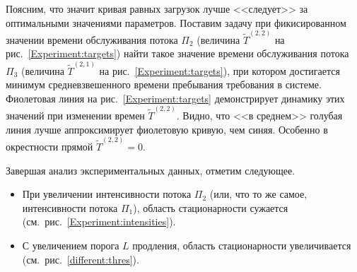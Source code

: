 Поясним, что значит кривая равных загрузок лучше <<следует>> за оптимальными значениями параметров. Поставим задачу при фикисированном значении времени обслуживания потока $\Pi_2$ (величина $\widetilde T^{(2,2)}$ на рис.~\ref{Experiment:targets}) найти такое значение времени обслуживания потока $\Pi_3$ (величина $\widetilde T^{(2,1)}$ на рис.~\ref{Experiment:targets}), при котором достигается минимум средневзвешенного времени пребывания требования в системе. Фиолетовая линия на рис.~\ref{Experiment:targets} демонстрирует динамику этих значений при изменении времен $\widetilde T^{(2,2)}$. Видно, что <<в среднем>> голубая линия лучше аппроксимирует фиолетовую кривую, чем синяя. Особенно в окрестности прямой $\widetilde T^{(2,2)}=0$. 

Завершая анализ экспериментальных данных, отметим следующее.
\begin{itemize}
    \item При увеличении интенсивности потока $\Pi_2$ (или, что то же самое, интенсивности потока $\Pi_1$), область стационарности сужается (см.~рис.~\ref{Experiment:intensities}).
    \item С увеличением порога $L$ продления, область стационарности увеличивается (см.~рис.~\ref{different:thres}).
\end{itemize}

